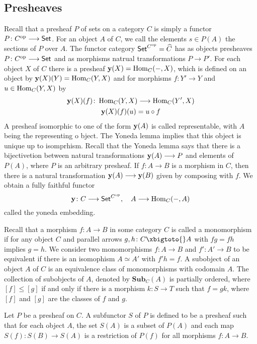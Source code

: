 \subsection{Presheaves}
Recall that a presheaf $P$ of sets on a category $C$ is simply a functor $P \colon C^{\text{op}} \longrightarrow \mathsf{Set}$. For an object $A$ of $C$, we call the elements $s \in P(A)$ the sections of $P$ over $A$. The functor category $\mathsf{Set}^{C^{\text{op}}} = \widehat{C}$ has as objects presheaves $P \colon C^{\text{op}} \longrightarrow \mathsf{Set}$ and as morphisms natrual transformations $P \to P'$. For each object $X$ of $C$ there is a presheaf $\mathbf{y}(X) = \operatorname{Hom}_C(-,X)$, which is defined on an object by $\mathbf{y}(X)(Y) = \operatorname{Hom}_C(Y,X)$ and for morphisms $f \colon Y' \to Y$ and $u \in \operatorname{Hom}_C(Y,X)$ by
\begin{gather*}
	\mathbf{y}(X)(f) \colon \operatorname{Hom}_C(Y,X) \longrightarrow \operatorname{Hom}_C(Y', X)\\
	\mathbf{y}(X)(f)(u) = u \circ f
\end{gather*}
A presheaf isomorphic to one of the form $\mathbf{y}(A)$ is called representable, with $A$ being the representing o bject. The Yoneda lemma implies that this object is unique up to isomprhism. Recall that the Yoneda lemma says that there is a bijectivetion between natural transformations $\mathbf{y}(A) \longrightarrow P$ and elements of $P(A)$, where $P$ is an arbitrary presheaf. If $f \colon A \to B$ is a morphism in $C$, then there is a natural transformation $\mathbf{y}(A) \longrightarrow \mathbf{y}(B)$ given by composing with $f$. We obtain a fully faithful functor
\[\mathbf{y} \colon C \longrightarrow \mathsf{Set}^{C^{\text{op}}},\quad A \longrightarrow \operatorname{Hom}_C(-,A)\]
called the yoneda embedding.

\begin{construction}[Subobjects]
	Recall that a morphism $f \colon A \to B$ in some category $C$ is called a monomorphism if for any object $C$ and parallel arrows $g, h \colon C \xbigtoto{} A$ with $fg = fh$ implies $g = h$. We consider two monomorphisms $f \colon A \to B$ and $f' \colon A' \to B$ to be equivalent if there is an isomophism $A \simeq A'$ with $f'h = f$. A subobject of an object $A$ of $C$ is an equivalence class of monomorphisms with codomain $A$. The collection of subobjects of $A$, denoted by $\mathbf{Sub}_C(A)$ is partially ordered, where $[f] \le [g]$ if and only if there is a morphism $k \colon S \to T$ such that $f = gk$, where $[f]$ and $[g]$ are the classes of $f$ and $g$.
\end{construction}

\begin{example}[Subfunctors]
	Let $P$ be a presheaf on $C$. A subfunctor $S$ of $P$ is defined to be a presheaf such that for each object $A$, the set $S(A)$ is a subset of $P(A)$ and each map $S(f): S(B) \to S(A)$ is a restriction of $P(f)$ for all morphisms $f \colon A \to B$.
\end{example}

